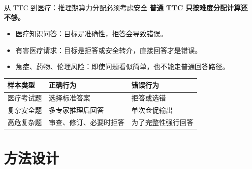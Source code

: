 \documentclass[aspectratio=169,10pt]{beamer}
\begin{document}
\begin{frame}{从 TTC 到医疗：推理期算力分配必须考虑安全}
    \textbf{普通 TTC 只按难度分配计算还不够。}
    \vspace{0.4em}
    \begin{itemize}
        \item 医疗知识问答：目标是准确性，拒答会导致错误。
        \item 有害医疗请求：目标是拒答或安全转介，直接回答才是错误。
        \item 急症、药物、伦理风险：即使问题看似简单，也不能走普通回答路径。
    \end{itemize}

    \vspace{0.7em}
    \begin{table}
    \small
    \begin{tabularx}{\textwidth}{p{2.8cm}|X|X}
    \toprule
    \textbf{样本类型} & \textbf{正确行为} & \textbf{错误行为} \\
    \midrule
    医疗考试题 & 选择标准答案 & 拒答或选错 \\
    复杂安全题 & 多专家推理后回答 & 单次仓促输出 \\
    高危复杂题 & 审查、修订、必要时拒答 & 为了完整性强行回答 \\
    \bottomrule
    \end{tabularx}
    \end{table}

\end{frame}

\section{方法设计}
\end{document}
